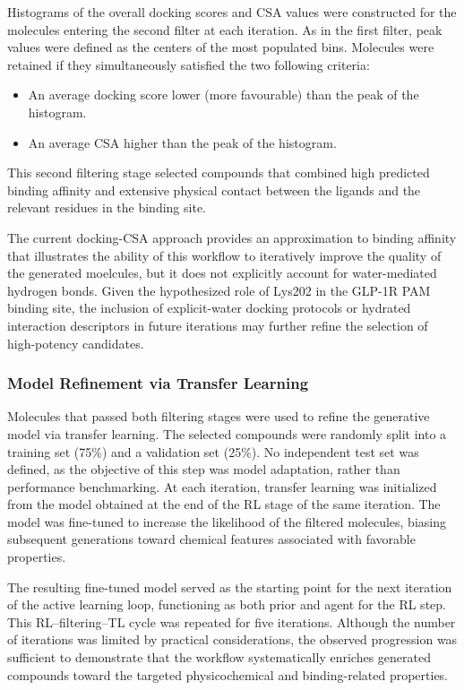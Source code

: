 \documentclass[letterpaper]{article}
\begin{document}
Histograms of the overall docking scores and CSA values were constructed for the molecules entering the second filter at each iteration. As in the first filter, peak values were defined as the centers of the most populated bins. Molecules were retained if they simultaneously satisfied the two following criteria:
\begin{itemize}
\item An average docking score lower (more favourable) than the peak of the histogram.
\item An average CSA higher than the peak of the histogram.
\end{itemize}
This second filtering stage selected compounds that combined high predicted binding affinity and extensive physical contact between the ligands and the relevant residues in the binding site. 

The current docking-CSA approach provides an approximation to binding affinity that illustrates the ability of this workflow to iteratively improve the quality of the generated moelcules, but it does not explicitly account for water-mediated hydrogen bonds. Given the hypothesized role of Lys202 in the GLP-1R PAM binding site, the inclusion of explicit-water docking protocols or hydrated interaction descriptors in future iterations may further refine the selection of high-potency candidates.

\subsubsection{Model Refinement via Transfer Learning}
Molecules that passed both filtering stages were used to refine the generative model via transfer learning. The selected compounds were randomly split into a training set (75\%) and a validation set (25\%). No independent test set was defined, as the objective of this step was model adaptation, rather than performance benchmarking. At each iteration, transfer learning was initialized from the model obtained at the end of the RL stage of the same iteration. The model was fine-tuned to increase the likelihood of the filtered molecules, biasing subsequent generations toward chemical features associated with favorable properties.

The resulting fine-tuned model served as the starting point for the next iteration of the active learning loop, functioning as both prior and agent for the RL step. This RL–filtering–TL cycle was repeated for five iterations. Although the number of iterations was limited by practical considerations, the observed progression was sufficient to demonstrate that the workflow systematically enriches generated compounds toward the targeted physicochemical and binding-related properties.
\end{document}
